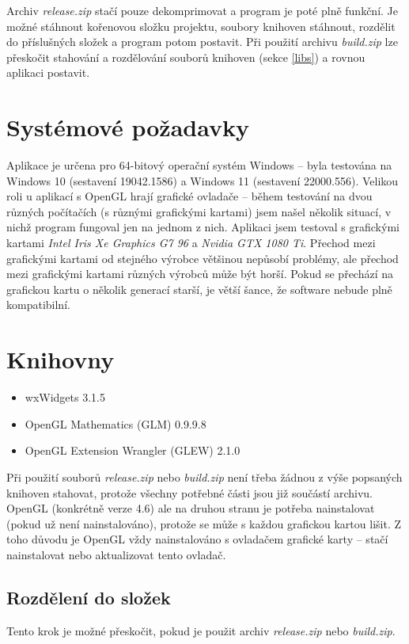 \documentclass[a4paper, 11pt]{report}
\begin{document}
Archiv \emph{release.zip} stačí pouze dekomprimovat a program je poté plně funkční. Je možné stáhnout kořenovou složku projektu, soubory knihoven stáhnout, rozdělit do příslušných složek a program potom postavit. Při použití archivu \emph{build.zip} lze přeskočit stahování a rozdělování souborů knihoven (sekce \ref{libs}) a rovnou aplikaci postavit.

\section{Systémové požadavky}
Aplikace je určena pro 64-bitový operační systém Windows -- byla testována na Windows 10 (sestavení 19042.1586) a Windows 11 (sestavení 22000.556). Velikou roli u aplikací s OpenGL hrají grafické ovladače -- během testování na dvou různých počítačích (s různými grafickými kartami) jsem našel několik situací, v nichž program fungoval jen na jednom z nich. Aplikaci jsem testoval s grafickými kartami \emph{Intel Iris Xe Graphics G7 96} a \emph{Nvidia GTX 1080 Ti}. Přechod mezi grafickými kartami od stejného výrobce většinou nepůsobí problémy, ale přechod mezi grafickými kartami různých výrobců může být horší. Pokud se přechází na grafickou kartu o několik generací starší, je větší šance, že software nebude plně kompatibilní.

\section{Knihovny}
\begin{itemize}
    \item wxWidgets 3.1.5
    \item OpenGL Mathematics (GLM) 0.9.9.8
    \item OpenGL Extension Wrangler (GLEW) 2.1.0
\end{itemize}
Při použití souborů \emph{release.zip} nebo \emph{build.zip} není třeba žádnou z výše popsaných knihoven stahovat, protože všechny potřebné části jsou již součástí archivu. OpenGL (konkrétně verze 4.6) ale na druhou stranu je potřeba nainstalovat (pokud už není nainstalováno), protože se může s každou grafickou kartou lišit. Z toho důvodu je OpenGL vždy nainstalováno s ovladačem grafické karty -- stačí nainstalovat nebo aktualizovat tento ovladač.

\subsection{\label{libs}Rozdělení do složek}
Tento krok je možné přeskočit, pokud je použit archiv \emph{release.zip} nebo \emph{build.zip}.
\end{document}
